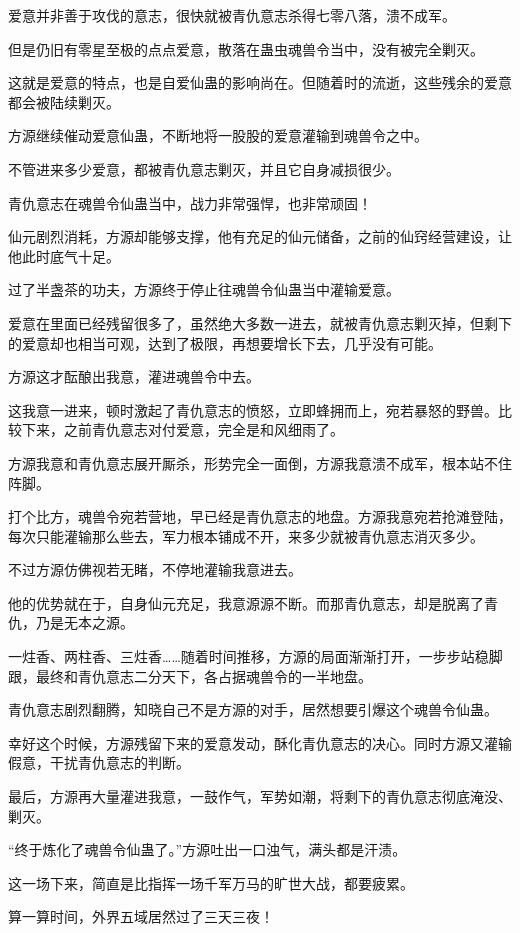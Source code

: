 \begin{this_body}
爱意并非善于攻伐的意志，很快就被青仇意志杀得七零八落，溃不成军。

但是仍旧有零星至极的点点爱意，散落在蛊虫魂兽令当中，没有被完全剿灭。

这就是爱意的特点，也是自爱仙蛊的影响尚在。但随着时的流逝，这些残余的爱意都会被陆续剿灭。

方源继续催动爱意仙蛊，不断地将一股股的爱意灌输到魂兽令之中。

不管进来多少爱意，都被青仇意志剿灭，并且它自身减损很少。

青仇意志在魂兽令仙蛊当中，战力非常强悍，也非常顽固！

仙元剧烈消耗，方源却能够支撑，他有充足的仙元储备，之前的仙窍经营建设，让他此时底气十足。

过了半盏茶的功夫，方源终于停止往魂兽令仙蛊当中灌输爱意。

爱意在里面已经残留很多了，虽然绝大多数一进去，就被青仇意志剿灭掉，但剩下的爱意却也相当可观，达到了极限，再想要增长下去，几乎没有可能。

方源这才酝酿出我意，灌进魂兽令中去。

这我意一进来，顿时激起了青仇意志的愤怒，立即蜂拥而上，宛若暴怒的野兽。比较下来，之前青仇意志对付爱意，完全是和风细雨了。

方源我意和青仇意志展开厮杀，形势完全一面倒，方源我意溃不成军，根本站不住阵脚。

打个比方，魂兽令宛若营地，早已经是青仇意志的地盘。方源我意宛若抢滩登陆，每次只能灌输那么些去，军力根本铺成不开，来多少就被青仇意志消灭多少。

不过方源仿佛视若无睹，不停地灌输我意进去。

他的优势就在于，自身仙元充足，我意源源不断。而那青仇意志，却是脱离了青仇，乃是无本之源。

一炷香、两柱香、三炷香……随着时间推移，方源的局面渐渐打开，一步步站稳脚跟，最终和青仇意志二分天下，各占据魂兽令的一半地盘。

青仇意志剧烈翻腾，知晓自己不是方源的对手，居然想要引爆这个魂兽令仙蛊。

幸好这个时候，方源残留下来的爱意发动，酥化青仇意志的决心。同时方源又灌输假意，干扰青仇意志的判断。

最后，方源再大量灌进我意，一鼓作气，军势如潮，将剩下的青仇意志彻底淹没、剿灭。

“终于炼化了魂兽令仙蛊了。”方源吐出一口浊气，满头都是汗渍。

这一场下来，简直是比指挥一场千军万马的旷世大战，都要疲累。

算一算时间，外界五域居然过了三天三夜！


\end{this_body}

